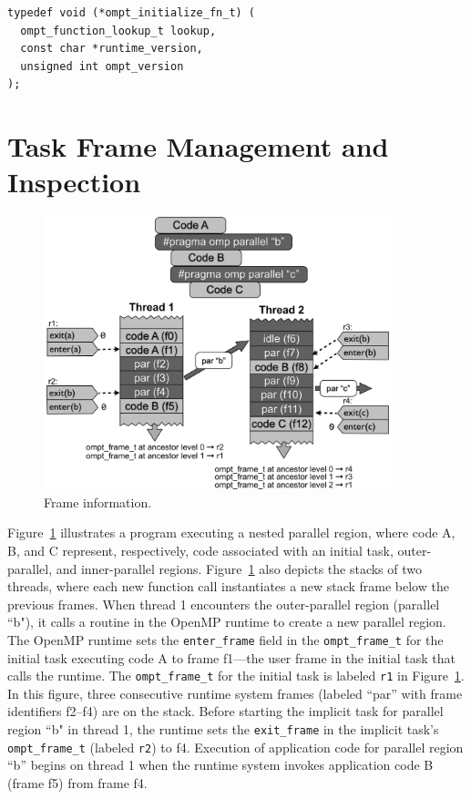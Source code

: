 \documentclass{article}
\begin{document}
{\begin{verbatim}
typedef void (*ompt_initialize_fn_t) (
  ompt_function_lookup_t lookup,
  const char *runtime_version, 
  unsigned int ompt_version
);
\end{verbatim}



\clearpage
\section{Task Frame Management and Inspection}
\label{app:frame}

   \begin{figure}[h]
    \centering
        \includegraphics[width=4in]{callstack-cropped.pdf}
    \caption{Frame information.}
    \label{fig:frame}
\end{figure}

\noindent
Figure~\ref{fig:frame} illustrates a program executing a nested parallel region, where code A, B, and C represent, respectively, code associated with an initial task, outer-parallel, and inner-parallel regions.  Figure~\ref{fig:frame}  also depicts the stacks of two threads, where each new function call instantiates a new stack frame below the previous frames. When thread 1 encounters the outer-parallel region (parallel ``b"), it calls a routine in the OpenMP runtime to create a new parallel region. The OpenMP runtime sets the \verb|enter_frame| field in the \verb|ompt_frame_t| for the initial task executing code A to  frame f1---the user frame in the initial task that calls the runtime. The  \verb|ompt_frame_t| for the initial task is labeled  \verb|r1| in Figure~\ref{fig:frame}. In this figure, three consecutive runtime system frames (labeled ``par'' with frame identifiers f2--f4) are on the stack. 
Before starting the implicit task for parallel region ``b" in thread 1, the runtime sets the \verb|exit_frame| in the implicit task's \verb|ompt_frame_t|  (labeled \verb|r2|) to f4. Execution of application code for parallel region ``b''  begins on thread 1  when the runtime system invokes application code B (frame f5) from frame f4. 

}
\end{document}

